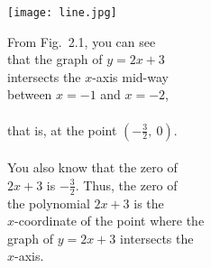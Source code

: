 \documentclass[12pt]{article}
\begin{document}
\begin{flushright}
    \vspace{-9em}\texttt{[image: line.jpg]} 
\end{flushright}
\vspace{-13em}
\hspace{2em}From Fig.~2.1, you can see\\
that the graph of \( y = 2x + 3 \)\\
intersects the \( x \)-axis mid-way\\
between \( x = -1 \) and \( x = -2 \),\\
\\ that is, at the point \( \left( -\frac{3}{2},\ 0 \right) \).\\
\\You also know that the zero of\\
\( 2x + 3 \) is \( -\frac{3}{2} \).
Thus, the zero of
\\the polynomial \( 2x + 3 \) is the\\
\( x \)-coordinate of the point where the\\
graph of \( y = 2x + 3 \) intersects the\\
\( x \)-axis.\\
\vspace{-5.7em}
\end{document}

